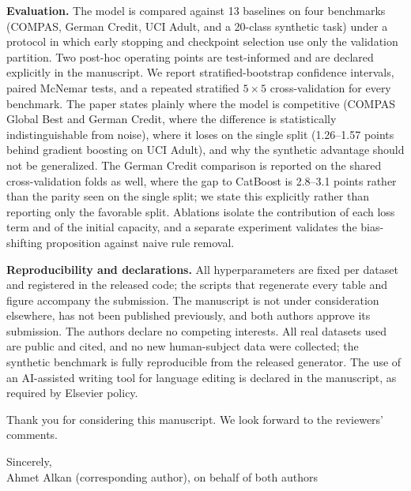 \documentclass[11pt]{article}
\begin{document}
\noindent\textbf{Evaluation.} The model is compared against 13 baselines on four
benchmarks (COMPAS, German Credit, UCI Adult, and a 20-class synthetic task)
under a protocol in which early stopping and checkpoint selection use only the
validation partition. Two post-hoc operating points are test-informed and are
declared explicitly in the manuscript.
We report stratified-bootstrap confidence intervals, paired McNemar tests, and a
repeated stratified $5\times5$ cross-validation for every benchmark. The
paper states plainly where the model is competitive (COMPAS Global Best and
German Credit, where the difference is statistically indistinguishable from
noise), where it loses on the single split (1.26--1.57 points behind gradient
boosting on UCI Adult),
and why the synthetic advantage should not be generalized. The German Credit
comparison is reported on the shared cross-validation folds as well, where the
gap to CatBoost is 2.8--3.1 points rather than the parity seen on the single split;
we state this explicitly rather than reporting only the favorable split. Ablations isolate the
contribution of each loss term and of the initial capacity, and a separate
experiment validates the bias-shifting proposition against naive rule removal.

\noindent\textbf{Reproducibility and declarations.} All hyperparameters are fixed
per dataset and registered in the released code; the scripts that regenerate
every table and figure accompany the submission. The manuscript is not under
consideration elsewhere, has not been published previously, and both authors
approve its submission. The authors declare no competing interests. All real
datasets used are public and cited, and no new human-subject data were
collected; the synthetic benchmark is fully reproducible from the released
generator. The use of an AI-assisted writing tool for language editing is
declared in the manuscript, as required by Elsevier policy.

\vspace{0.5em}
\noindent Thank you for considering this manuscript. We look forward to the
reviewers' comments.

\vspace{1.5em}
\noindent Sincerely,\\
Ahmet Alkan (corresponding author), on behalf of both authors
\end{document}

